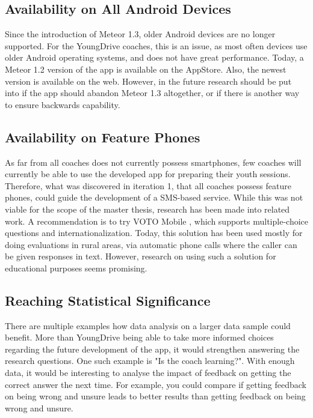 \subsection{Availability on All Android Devices}
Since the introduction of Meteor 1.3, older Android devices are no longer supported. For the YoungDrive coaches, this is an issue, as most often devices use older Android operating systems, and does not have great performance. Today, a Meteor 1.2 version of the app is available on the AppStore. Also, the newest version is available on the web. However, in the future research should be put into if the app should abandon Meteor 1.3 altogether, or if there is another way to ensure backwards capability.

\subsection{Availability on Feature Phones}
As far from all coaches does not currently possess smartphones, few coaches will currently be able to use the developed app for preparing their youth sessions. Therefore, what was discovered in iteration 1, that all coaches possess feature phones, could guide the development of a SMS-based service. While this was not viable for the scope of the master thesis, research has been made into related work. A recommendation is to try VOTO Mobile \citep{voto-mobile}, which supports multiple-choice questions and internationalization. Today, this solution has been used mostly for doing evaluations in rural areas, via automatic phone calls where the caller can be given responses in text. However, research on using such a solution for educational purposes seems promising.

\subsection{Reaching Statistical Significance}
There are multiple examples how data analysis on a larger data sample could benefit. More than YoungDrive being able to take more informed choices regarding the future development of the app, it would strengthen answering the research questions. One such example is "Is the coach learning?". With enough data, it would be interesting to analyse the impact of feedback on getting the correct answer the next time. For example, you could compare if getting feedback on being wrong and unsure leads to better results than getting feedback on being wrong and unsure.
